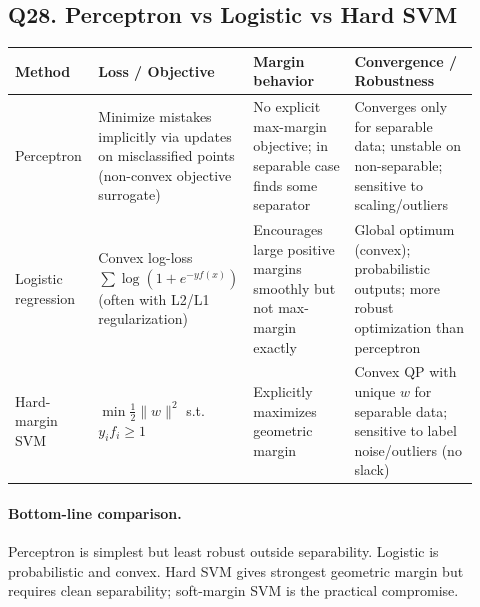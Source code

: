 \documentclass[11pt]{article}
\newcommand{\1}{\mathbf{1}}
\begin{document}
\subsection*{Q28. Perceptron vs Logistic vs Hard SVM}
\begin{center}
\begin{tabular}{>{\raggedright\arraybackslash}p{0.18\linewidth} >{\raggedright\arraybackslash}p{0.25\linewidth} >{\raggedright\arraybackslash}p{0.22\linewidth} >{\raggedright\arraybackslash}p{0.27\linewidth}}
\toprule
Method & Loss / Objective & Margin behavior & Convergence / Robustness \\
\midrule
Perceptron & Minimize mistakes implicitly via updates on misclassified points (non-convex objective surrogate) & No explicit max-margin objective; in separable case finds some separator & Converges only for separable data; unstable on non-separable; sensitive to scaling/outliers \\
\addlinespace
Logistic regression & Convex log-loss $\sum\log(1+e^{-y f(x)})$ (often with L2/L1 regularization) & Encourages large positive margins smoothly but not max-margin exactly & Global optimum (convex); probabilistic outputs; more robust optimization than perceptron \\
\addlinespace
Hard-margin SVM & $\min \frac12\|w\|^2$ s.t. $y_if_i\ge1$ & Explicitly maximizes geometric margin & Convex QP with unique $w$ for separable data; sensitive to label noise/outliers (no slack) \\
\bottomrule
\end{tabular}
\end{center}

\paragraph{Bottom-line comparison.}
Perceptron is simplest but least robust outside separability. Logistic is probabilistic and convex. Hard SVM gives strongest geometric margin but requires clean separability; soft-margin SVM is the practical compromise.
\end{document}
